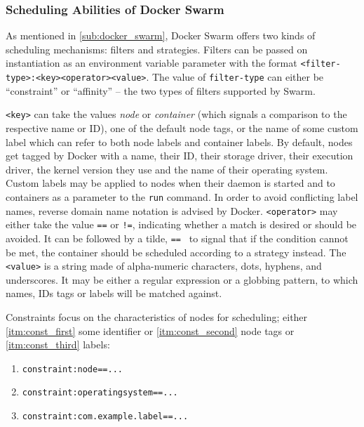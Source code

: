   \subsubsection{Scheduling Abilities of Docker Swarm} %
    \label{ssub:abilities_of_docker_swarm}
    As mentioned in \ref{sub:docker_swarm}, Docker Swarm offers two kinds of scheduling mechanisms: filters and strategies. Filters can be passed on instantiation as an environment variable parameter with the format \texttt{<filter-type>:<key><operator><value>}. The value of \texttt{filter-type} can either be ``constraint'' or ``affinity'' -- the two types of filters supported by Swarm.

    \texttt{<key>} can take the values \emph{node} or \emph{container} (which signals a comparison to the respective name or \ac{ID}), one of the default node tags, or the name of some custom label which can refer to both node labels and container labels. By default, nodes get tagged by Docker with a name, their \ac{ID}, their storage driver, their execution driver, the kernel version they use and the name of their operating system.
    Custom labels may be applied to nodes when their daemon is started and to containers as a parameter to the \texttt{run} command. In order to avoid conflicting label names, reverse domain name notation is advised by Docker.
    \texttt{<operator>} may either take the value \texttt{==} or \texttt{!=}, indicating whether a match is desired or should be avoided. It can be followed by a tilde, \eg \texttt{==~} to signal that if the condition cannot be met, the container should be scheduled according to a strategy instead.
    The \texttt{<value>} is a string made of alpha-numeric characters, dots, hyphens, and underscores. It may be either a regular expression or a globbing pattern, to which names, \acp{ID} tags or labels will be matched against.

    Constraints focus on the characteristics of nodes for scheduling; either \ref{itm:const_first} some identifier or \ref{itm:const_second} node tags or \ref{itm:const_third} labels:

    \begin{enumerate}[label=\alph*), nosep]
      \item \label{itm:const_first} \texttt{constraint:node==...}
      \item \label{itm:const_second} \texttt{constraint:operatingsystem==...}
      \item \label{itm:const_third} \texttt{constraint:com.example.label==...}
    \end{enumerate}

